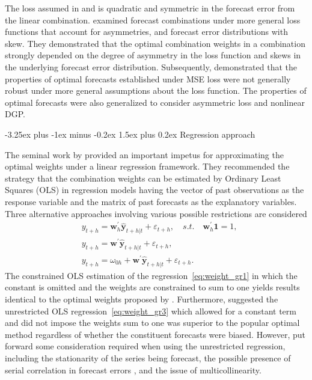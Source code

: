 \documentclass[11pt]{article}
\makeatletter
\renewcommand{\paragraph}{\@startsection{paragraph}{4}{0ex}%
   {-3.25ex plus -1ex minus -0.2ex}%
   {1.5ex plus 0.2ex}%
   {\normalfont\normalsize\bfseries}}
\makeatother
\begin{document}
The loss assumed in \cite{Bates1969-yj} and \cite{Newbold1974-lp} is quadratic and symmetric in the forecast error from the linear combination. \cite{Elliott2004-dz} examined forecast combinations under more general loss functions that account for asymmetries, and forecast error distributions with skew. They demonstrated that the optimal combination weights in a combination strongly depended on the degree of asymmetry in the loss function and skews in the underlying forecast error distribution. Subsequently, \cite{Patton2007-zo} demonstrated that the properties of optimal forecasts established under MSE loss were not generally robust under more general assumptions about the loss function. The properties of optimal forecasts were also generalized to consider asymmetric loss and nonlinear DGP.

\paragraph{Regression approach}

The seminal work by \cite{Granger1984-jc} provided an important impetus for approximating the optimal weights under a linear regression framework. They recommended the strategy that the combination weights can be estimated by Ordinary Least Squares (OLS) in regression models having the vector of past observations as the response variable and the matrix of past forecasts as the explanatory variables. Three alternative approaches involving various possible restrictions are considered
\begin{align}
&y_{t+h}=\boldsymbol{w}_{h}^{\prime} \hat{\mathbf{y}}_{t+h|t}+\varepsilon_{t+h}, \quad s.t. \quad \boldsymbol{w}_{h}^{\prime}\mathbf{1}=1, \label{eq:weight_gr1}\\
&y_{t+h}=\boldsymbol{w}^{\prime} \hat{\mathbf{y}}_{t+h|t}+\varepsilon_{t+h}, \label{eq:weight_gr2}\\
&y_{t+h}=\omega_{0h}+\boldsymbol{w}^{\prime} \hat{\mathbf{y}}_{t+h|t}+\varepsilon_{t+h}. \label{eq:weight_gr3}
\end{align}
The constrained OLS estimation of the regression~\eqref{eq:weight_gr1} in which the constant is omitted and the weights are constrained to sum to one yields results identical to the optimal weights proposed by \cite{Bates1969-yj}. Furthermore, \cite{Granger1984-jc} suggested the unrestricted OLS regression~\eqref{eq:weight_gr3} which allowed for a constant term and did not impose the weights sum to one was superior to the popular optimal method regardless of whether the constituent forecasts were biased. However, \cite{De_Menezes2000-vd} put forward some consideration required when using the unrestricted regression, including the stationarity of the series being forecast, the possible presence of serial correlation in forecast errors \citep[see also][]{Diebold1988-sx,Edward_Coulson1993-db}, and the issue of multicollinearity.
\end{document}
